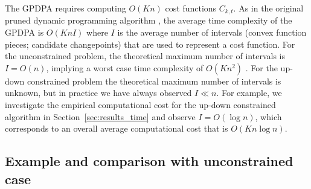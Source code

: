 \documentclass[twoside,11pt]{article}
\begin{document}
The GPDPA requires
computing $O(Kn)$ cost functions $C_{k,t}$. As in the original
pruned dynamic programming algorithm \citep{pruned-dp}, the average time
complexity of the GPDPA is $O(K n I)$ where $I$ is the average number of
intervals (convex function pieces; candidate changepoints) that are
used to represent a cost function. For the unconstrained problem, the theoretical maximum number of
intervals is $I=O(n)$, implying a worst case time complexity of $O(K n^2)$
\citep{pruned-dp-new}.
For the up-down constrained problem the theoretical maximum number of intervals is unknown, but in practice we have always observed $I\ll n$. For example,
we investigate the empirical computational cost for the
up-down constrained algorithm in Section~\ref{sec:results_time} and observe $I=O(\log n)$, which corresponds to an overall average computational cost that
is $O(Kn\log n)$.

\subsection{Example and comparison with unconstrained case}
\label{sec:example-comparison}
\end{document}
